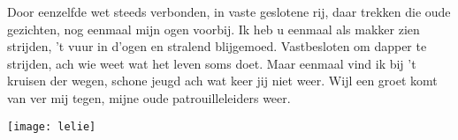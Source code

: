 \beginverse*
Door eenzelfde wet steeds verbonden,
in vaste geslotene rij,
daar trekken die oude gezichten,
nog eenmaal mijn ogen voorbij.
Ik heb u eenmaal als makker zien strijden,
't vuur in d’ogen en stralend blijgemoed.
Vastbesloten om dapper te strijden,
ach wie weet wat het leven soms doet.
Maar eenmaal vind ik bij 't kruisen der wegen,
schone jeugd ach wat keer jij niet weer.
Wijl een groet komt van ver mij tegen,
mijne oude patrouilleleiders weer.
\endverse
\endsong
\begin{intersong}
	\begin{center}
		\texttt{[image: lelie]}
	\end{center}
\end{intersong}